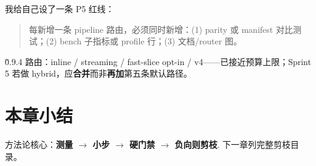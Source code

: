 我给自己设了一条 P5 红线：

\begin{quote}
每新增一条 pipeline 路由，必须同时新增：(1) parity 或 manifest 对比测试；(2) bench 子指标或 profile 行；(3) 文档/router 图。
\end{quote}

\v0.9.4 路由：inline / streaming / fast-slice opt-in / v4——已接近预算上限；Sprint 5 若做 hybrid，应\textbf{合并}而非\textbf{再加}第五条默认路径。

\section{本章小结}

方法论核心：\textbf{测量 $\rightarrow$ 小步 $\rightarrow$ 硬门禁 $\rightarrow$ 负向则剪枝}. 下一章列完整剪枝目录。
